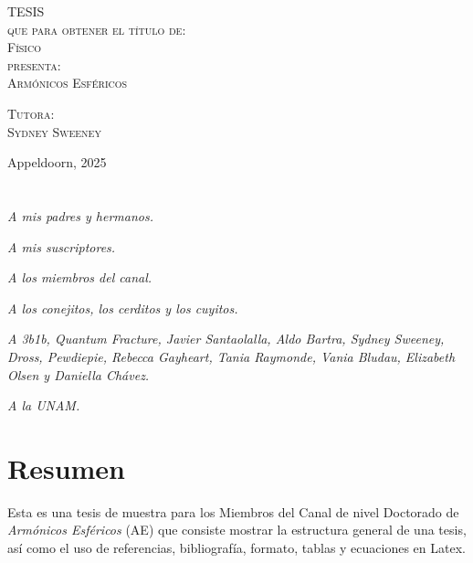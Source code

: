 \documentclass[letter,twoside,12pt]{book}
\begin{document}
\begin{titlepage}
\begin{minipage}[c][0.81\textheight][t]{0.75\textwidth}
\begin{center}
                \vspace{2cm}            

                \textsc{\LARGE T\hspace{1.5cm}E\hspace{1.5cm}S\hspace{1.5cm}I\hspace{1.5cm}S}\\[0.5cm]
                \textsc{\large que para obtener el t\'itulo de:}\\[0.5cm]
                \textsc{\large Físico}\\[0.5cm]
                \textsc{\large presenta:}\\[0.5cm]
                \textsc{\large {Armónicos Esféricos}}\\[2cm]          

                \vspace{0.5cm}

                {\large\scshape Tutora:\\[0.3cm] {Sydney Sweeney}}\\[.2in]

                \vspace{0.5cm}

                \large{Appeldoorn, }{}{2025}
            \end{center}
        \end{minipage}
    \end{titlepage}




\chapter*{}
\begin{flushleft}
  \emph{A mis padres y hermanos.}
  
  \emph{A mis suscriptores.}
  
  \emph{A los miembros del canal.}
  
  \emph{A los conejitos, los cerditos y los cuyitos.}

  \emph{A 3b1b, Quantum Fracture, Javier Santaolalla, Aldo Bartra, Sydney Sweeney, Dross, Pewdiepie, Rebecca Gayheart, Tania Raymonde, Vania Bludau, Elizabeth Olsen y Daniella Chávez.}
  
  \emph{A la UNAM.}

\end{flushleft}
\chapter*{Resumen}
Esta es una tesis de muestra para los Miembros del Canal de nivel Doctorado de \textit{Armónicos Esféricos} (AE) que consiste mostrar la estructura general de una tesis, así como el uso de referencias, bibliografía, formato, tablas y ecuaciones en Latex.
\end{document}
